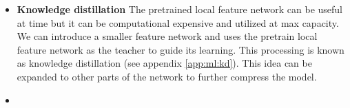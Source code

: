 \begin{itemize}
    \item \textbf{Knowledge distillation} The pretrained local feature network can be useful at time but it can be computational expensive and utilized at max capacity. We can introduce a smaller feature network and uses the pretrain local feature network as the teacher to guide its learning. This processing is known as knowledge distillation (see appendix \ref{app:ml:kd}). This idea can be expanded to other parts of the network to further compress the model.
    \item \textbf{}
\end{itemize}


